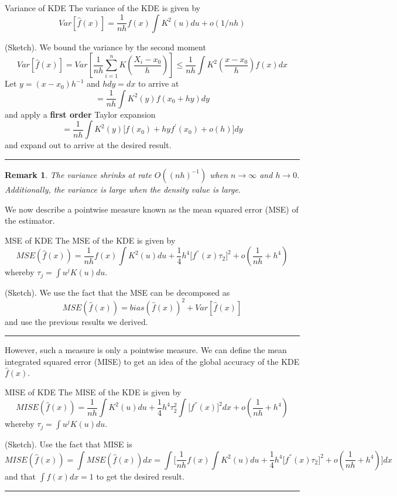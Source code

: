 \documentclass[twoside]{article}
\newtheorem{remark}[theorem]{Remark}
\newenvironment{proof}{{\bf Proof:}}{\hfill\rule{2mm}{2mm}}
\begin{document}
\begin{proposition_exam}{Variance of KDE}{} The variance of the KDE is given by 
\begin{equation}
Var[\hat{f}(x)] = \frac{1}{nh}f(x) \int K^2(u)du + o(1/nh)
\end{equation}
\end{proposition_exam}

\begin{proof}(Sketch). We bound the variance by the second moment 
$$
Var[\hat{f}(x)] = Var[\frac{1}{nh}\sum_{i=1}^{n}K(\frac{X_i - x_0}{h})] \leq \frac{1}{nh}\int K^2(\frac{x - x_0}{h})f(x)dx
$$
Let $y = (x - x_0)h^{-1}$ and $hdy = dx$ to arrive at 
$$
= \frac{1}{nh}\int K^2(y)f(x_0 + hy)dy
$$
and apply a \textbf{first order} Taylor expansion 
$$
= \frac{1}{nh} \int K^2(y)\big[f(x_0) + hyf^{'}(x_0) + o(h) \big]dy
$$
and expand out to arrive at the desired result.
\end{proof}

\begin{remark} The variance shrinks at rate $O((nh)^{-1})$ when $n \rightarrow \infty$ and $h \rightarrow 0.$ Additionally, the variance is large when the density value is large.
\end{remark}

We now describe a pointwise measure known as the mean squared error (MSE) of the estimator.

\begin{proposition_exam}{MSE of KDE}{} The MSE of the KDE is given by 
\begin{equation}
MSE(\hat{f}(x)) = \frac{1}{nh}f(x)\int K^2(u)du + \frac{1}{4}h^4\big[f^{''}(x)\tau_2 \big]^2 + o(\frac{1}{nh} + h^4)
\end{equation}
whereby $\tau_j = \int u^jK(u)du.$
\end{proposition_exam}

\begin{proof}(Sketch). We use the fact that the MSE can be decomposed as 
$$
MSE(\hat{f}(x)) = bias(\hat{f}(x))^2 + Var[\hat{f}(x)]
$$
and use the previous results we derived.
\end{proof}

However, such a measure is only a pointwise measure. We can define the mean integrated squared error (MISE) to get an idea of the global accuracy of the KDE $\hat{f}(x).$ 

\begin{proposition_exam}{MISE of KDE}{} The MISE of the KDE is given by 
\begin{equation}
MISE(\hat{f}(x)) = \frac{1}{nh}\int K^2(u)du + \frac{1}{4}h^4\tau_{2}^{2}\int \big[f^{''}(x) \big]^2dx + o(\frac{1}{nh} + h^4)
\end{equation}
whereby $\tau_j = \int u^jK(u)du.$
\end{proposition_exam}
\begin{proof}(Sketch). Use the fact that MISE is 
$$
MISE(\hat{f}(x)) = \int MSE(\hat{f}(x)) dx= \int \big[\frac{1}{nh}f(x)\int K^2(u)du + \frac{1}{4}h^4\big[f^{''}(x)\tau_2 \big]^2 + o(\frac{1}{nh} + h^4) ]dx
$$
and that $\int f(x)dx = 1$ to get the desired result.
\end{proof}
\end{document}
